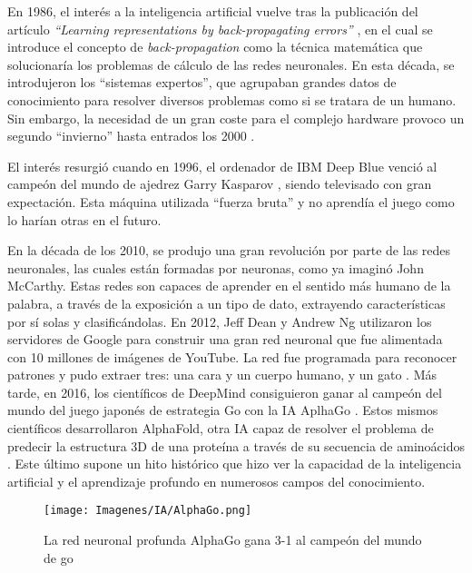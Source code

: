 \documentclass{report}
\begin{document}
En 1986, el interés a la inteligencia artificial vuelve tras la publicación del artículo \textit{``Learning representations by back-propagating errors''} \cite{LibroFinInvierno}, en el cual se introduce el concepto de \textit{back-propagation} como la técnica matemática que solucionaría los problemas de cálculo de las redes neuronales. En esta década, se introdujeron los ``sistemas expertos'', que agrupaban grandes datos de conocimiento para resolver diversos problemas como si se tratara de un humano. Sin embargo, la necesidad de un gran coste para el complejo hardware provoco un segundo ``invierno'' hasta entrados los 2000 \cite{SegundoInviernoIA}.

El interés resurgió cuando en 1996, el ordenador de IBM Deep Blue venció al campeón del mundo de ajedrez Garry Kasparov \cite{KasparovDeepBlue}, siendo televisado con gran expectación. Esta máquina utilizada ``fuerza bruta'' y no aprendía el juego como lo harían otras en el futuro.

En la década de los 2010, se produjo una gran revolución por parte de las redes neuronales, las cuales están formadas por neuronas, como ya imaginó John McCarthy. Estas redes son capaces de aprender en el sentido más humano de la palabra, a través de la exposición a un tipo de dato, extrayendo características por sí solas y clasificándolas. En 2012, Jeff Dean y Andrew Ng utilizaron los servidores de Google para construir una gran red neuronal que fue alimentada con 10 millones de imágenes de YouTube. La red fue programada para reconocer patrones y pudo extraer tres: una cara y un cuerpo humano, y un gato \cite{JeffanAndrew}. Más tarde, en 2016, los científicos de DeepMind consiguieron ganar al campeón del mundo del juego japonés de estrategia Go con la IA AplhaGo \cite{AlphaGo}. Estos mismos científicos desarrollaron AlphaFold, otra IA capaz de resolver el problema de predecir la estructura 3D de una proteína a través de su secuencia de aminoácidos \cite{AlphaFold}. Este último supone un hito histórico que hizo ver la capacidad de la inteligencia artificial y el aprendizaje profundo en numerosos campos del conocimiento.

\vspace{0.4cm}
\begin{figure}[H]
    \centering
    \texttt{[image: Imagenes/IA/AlphaGo.png]}
    \caption{ La red neuronal profunda AlphaGo gana 3-1 al campeón del mundo de go \cite{AlphaGoGuardian} }
    \label{fig:AlhaGO}
\end{figure}
\vspace{0.4cm}
\end{document}
